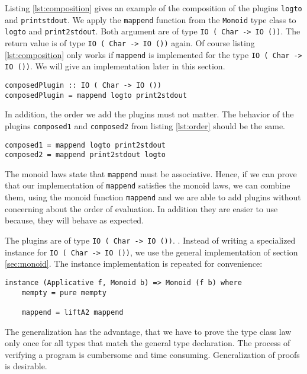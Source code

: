 Listing \ref{lst:composition} gives an example of the composition of the plugins \verb|logto| and \verb|printstdout|. We apply the \verb|mappend| function from the \verb|Monoid| type class to \verb|logto| and \verb|print2stdout|. Both argument are of type \verb|IO ( Char -> IO ())|. The return value is of type \verb|IO ( Char -> IO ())| again. Of course listing \ref{lst:composition} only works if \verb|mappend| is implemented for the type \verb|IO ( Char -> IO ())|. We will give an implementation later in this section.

\begin{lstlisting}[caption={Composition of two plugins}, label={lst:composition}]
composedPlugin :: IO ( Char -> IO ())
composedPlugin = mappend logto print2stdout
\end{lstlisting}

In addition, the order we add the plugins must not matter. The behavior of the plugins \verb|composed1| and \verb|composed2| from listing \ref{lst:order} should be the same.

\begin{lstlisting}[caption={The order of the plugins must not matter.}, label={lst:order}]
composed1 = mappend logto print2stdout
composed2 = mappend print2stdout logto
\end{lstlisting}

The monoid laws state that \verb|mappend| must be associative. Hence, if we can prove that our implementation of \verb|mappend| satisfies the monoid laws, we can combine them, using the monoid function \verb|mappend| and we are able to add plugins without concerning about the order of evaluation. In addition they are easier to use because, they will behave as expected.

The plugins are of type \verb|IO ( Char -> IO ())|. . Instead of writing a specialized instance for \verb|IO ( Char -> IO ())|, we use the general implementation of section \ref{sec:monoid}.
The instance implementation is repeated for convenience:

\begin{lstlisting}[caption={Monoid instance},label={lst:monoidinstance}]
instance (Applicative f, Monoid b) => Monoid (f b) where
    mempty = pure mempty

    mappend = liftA2 mappend
\end{lstlisting}
The generalization has the advantage, that we have to prove the type class law only once for all types that match the general type declaration. The process of verifying a program is cumbersome and time consuming. Generalization of proofs is desirable.

